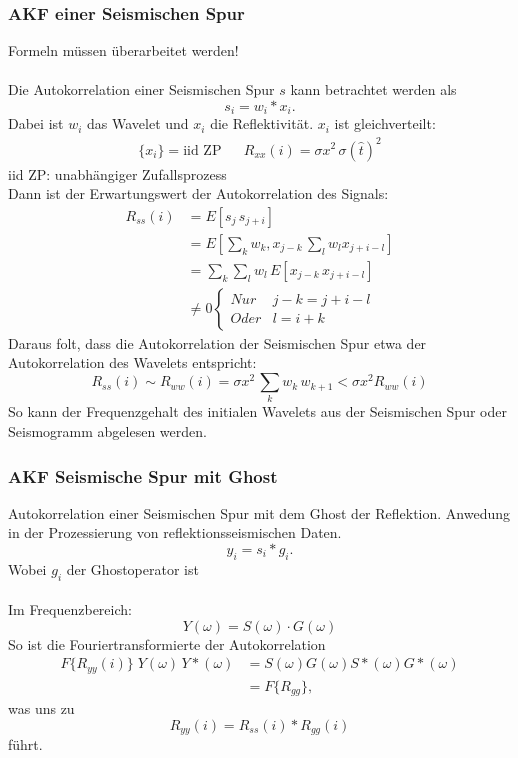 \subsubsection*{AKF einer Seismischen Spur}
{\color{red}Formeln müssen überarbeitet werden!}\\\\
Die Autokorrelation einer Seismischen Spur $s$ kann betrachtet werden als
\[
s_i = w_i * x_i.
\]
{\small Dabei ist $w_i$ das Wavelet und $x_i$ die Reflektivität.}
$x_i$ ist gleichverteilt:
\begin{align*}
\{x_i\} = \mbox{iid ZP} & & R_{xx}(i) = \sigma x^2 \, \sigma(\hat{t})^2
\end{align*}
{\small iid ZP: unabhängiger Zufallsprozess}\\
Dann ist der Erwartungswert der Autokorrelation des Signals:
\begin{align*}
R_{ss}(i) & = E[s_j\, s_{j+i}]\\
& = E\left[\sum_k w_k, x_{j-k}\, \sum_l w_l x_{j+i-l}\right]\\
& = \sum_k \sum_l w_l\,E[x_{j-k}\,x_{j+i-l}]\\
& \not= 0
\begin{cases}
Nur & j-k = j+i-l\\
Oder & l = i+k
\end{cases}
\end{align*}
Daraus folt, dass die Autokorrelation der Seismischen Spur etwa der Autokorrelation des Wavelets entspricht:
\[
R_{ss}(i) \sim R_{ww}(i) = \sigma x^2 \, \sum_k w_k \, w_{k+1} < \sigma x^2 R_{ww}(i)
\]
So kann der Frequenzgehalt des initialen Wavelets aus der Seismischen Spur oder Seismogramm abgelesen werden.

\subsubsection*{AKF Seismische Spur mit Ghost}
Autokorrelation einer Seismischen Spur mit dem Ghost der Reflektion. Anwedung in der Prozessierung von reflektionsseismischen Daten.
\[
y_i = s_i * g_i.
\]
{\small Wobei $g_i$ der Ghostoperator ist}\\\\
Im Frequenzbereich:
\[
Y(\omega) = S(\omega) \cdot G(\omega)
\]
So ist die Fouriertransformierte der Autokorrelation
\begin{align*}
F\{R_{yy}(i)\}\;Y(\omega)\,Y*(\omega) & = S(\omega) G(\omega) S*(\omega) G*(\omega)\\
& = F\{R_{gg}\},
\end{align*}
was uns zu
\[
R_{yy}(i) = R_{ss}(i)*R_{gg}(i)
\]
führt.

